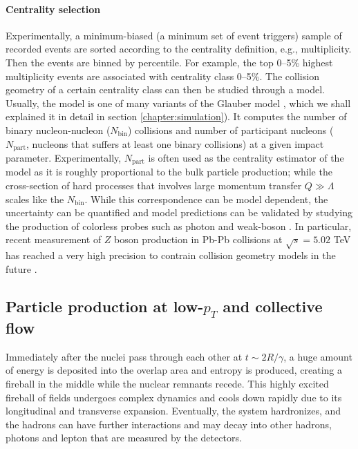 \paragraph{Centrality selection} Experimentally, a minimum-biased (a minimum set of event triggers) sample of recorded events are sorted according to the centrality definition, e.g., multiplicity. 
Then the events are binned by percentile.
For example, the top 0--5\% highest multiplicity events are associated with centrality class 0--5\%. 
The collision geometry of a certain centrality class can then be studied through a model.
Usually, the model is one of many variants of the Glauber model \cite{Miller:2007ri}, which we shall explained it in detail in section \ref{chapter:simulation}).
It computes the number of binary nucleon-nucleon ($N_{\textrm{bin}}$) collisions and number of participant nucleons ($N_{\textrm{part}}$, nucleons that suffers at least one binary collisions) at a given impact parameter.
Experimentally, $N_{\textrm{part}}$ is often used as the centrality estimator of the model as it is roughly proportional to the bulk particle production; while the cross-section of hard processes that involves large momentum transfer $Q \gg \Lambda$ scales like the $N_{\textrm{bin}}$.
While this correspondence can be model dependent, the uncertainty can be quantified and model predictions can be validated by studying the production of colorless probes such as photon and weak-boson \cite{Afanasiev:2012dg,Chatrchyan:2011ua,Aad:2012ew,Aad:2015lcb,Adam:2015lda}.
In particular, recent measurement of $Z$ boson production in Pb-Pb collisions at $\sqrt{s}=5.02$ TeV has reached a very high precision to contrain collision geometry models in the future \cite{ATLAS:2017zkv}.

\subsection{Particle production at low-$p_T$ and collective flow} 
Immediately after the nuclei pass through each other at $t\sim 2R/\gamma$, a huge amount of energy is deposited into the overlap area and entropy is produced, creating a fireball in the middle while the nuclear remnants recede.
This highly excited fireball of fields undergoes complex dynamics and cools down rapidly due to its longitudinal and transverse expansion.
Eventually, the system hardronizes, and the hadrons can have further interactions and may decay into other hadrons, photons and lepton that are measured by the detectors.

